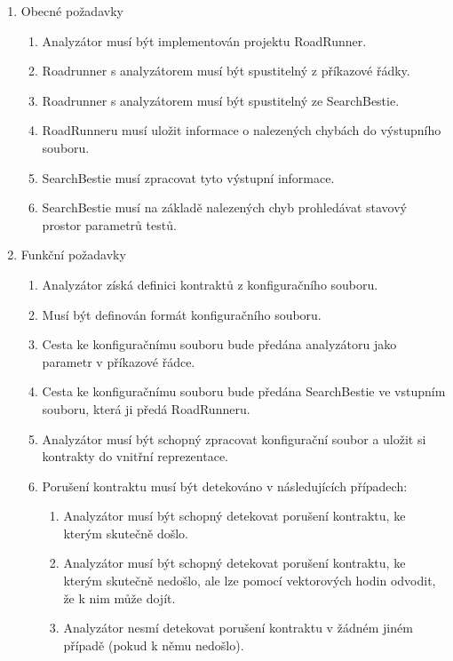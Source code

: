 \begin{enumerate}\itemsep0em
\item{Obecné požadavky}
\begin{enumerate}
	\item{Analyzátor musí být implementován projektu RoadRunner.}
	\item{Roadrunner s analyzátorem musí být spustitelný z příkazové řádky.}
	\item{Roadrunner s analyzátorem musí být spustitelný ze SearchBestie.}
	\item{RoadRunneru musí uložit informace o nalezených chybách do výstupního souboru.}
	\item{SearchBestie musí zpracovat tyto výstupní informace.}
	\item{SearchBestie musí na základě nalezených chyb prohledávat stavový prostor parametrů testů.}
\end{enumerate}

\item{Funkční požadavky}
\begin{enumerate}
	\item{Analyzátor získá definici kontraktů z konfiguračního souboru.}
	\item{Musí být definován formát konfiguračního souboru.}
	\item{Cesta ke konfiguračnímu souboru bude předána analyzátoru jako parametr v příkazové řádce.}
	\item{Cesta ke konfiguračnímu souboru bude předána SearchBestie ve vstupním souboru, která ji předá RoadRunneru.}
	\item{Analyzátor musí být schopný zpracovat konfigurační soubor a uložit si kontrakty do vnitřní reprezentace.}

	\item{Porušení kontraktu musí být detekováno v následujících případech:}
		\begin{enumerate}
			\item{Analyzátor musí být schopný detekovat porušení kontraktu, ke kterým skutečně došlo.}
			\item{Analyzátor musí být schopný detekovat porušení kontraktu, ke kterým skutečně nedošlo, ale lze pomocí vektorových hodin odvodit, že k nim může dojít.}
			\item{Analyzátor nesmí detekovat porušení kontraktu v žádném jiném případě (pokud k němu nedošlo).}
		\end{enumerate}	


\end{enumerate}
\end{enumerate}
